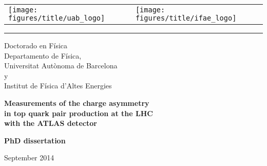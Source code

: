 \linespread{1.5}
\pagestyle{empty}
\begin{center}
\par
\vspace{6pt}
\begin{tabular}{p{5cm}p{5cm}}
\texttt{[image: figures/title/uab\_logo]}&
\texttt{[image: figures/title/ifae\_logo]}\\
\end{tabular}
\par
\vspace{6pt}
\hrule 
\par
\vspace{6pt}
\par
\begin{Large}
Doctorado en F\'isica\\
\vspace{-5pt}
Departamento de F\'isica,\\
\vspace{-10pt}
Universitat Autònoma de Barcelona\\
\vspace{-10pt}
y\\
\vspace{-10pt}
Institut de F\'isica d'Altes Energies\\
\end{Large}
\vspace{80pt}
{\huge \bfseries Measurements of the charge asymmetry } \\
\vspace{6pt}
{\huge \bfseries in top quark pair production at the LHC } \\
\vspace{6pt}
{\huge \bfseries  with the ATLAS detector }
\vspace{40pt} \\

\begin{large}
\textbf{PhD dissertation}
\par
\vspace{2pt}
\par
September 2014 \\ 
\par
\vspace{48pt}
\par
\end{large} 


\end{center}
